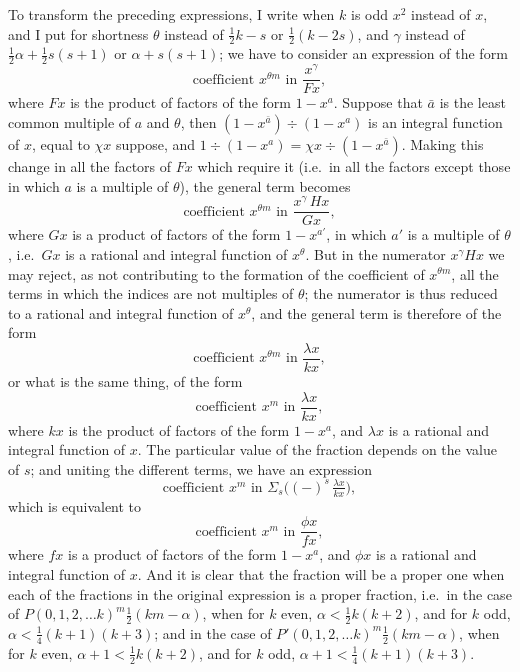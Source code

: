 \documentclass[11pt]{article}
\begin{document}
To transform the preceding expressions, I write when $k$ is odd $x^2$ instead of $x$, and I put for shortness $\theta$ instead of $\tfrac{1}{2}k - s$ or $\tfrac{1}{2}(k - 2s)$, and $\gamma$ instead of $\tfrac{1}{2}\alpha + \tfrac{1}{2}s(s+1)$ or $\alpha + s(s + 1)$; we have to consider an expression of the form
\[
\text{coefficient } x^{\theta m} \text{ in } \frac{x^\gamma}{F x},
\]
where $F x$ is the product of factors of the form $1 - x^a$. Suppose that $\bar{a}$ is the least common multiple of $a$ and $\theta$, then $(1 - x^{\bar{a}}) \div (1 - x^a)$ is an integral function of $x$, equal to $\chi x$ suppose, and $1 \div (1 - x^a) = \chi x \div (1 - x^{\bar{a}})$. Making this change in all the factors of $F x$ which require it (i.e.\ in all the factors except those in which $a$ is a multiple of $\theta$), the general term becomes
\[
\text{coefficient } x^{\theta m} \text{ in } \frac{x^\gamma\,H x}{G x},
\]
where $G x$ is a product of factors of the form $1 - x^{a'}$, in which $a'$ is a multiple of $\theta$, i.e.\ $G x$ is a rational and integral function of $x^\theta$. But in the numerator $x^\gamma H x$ we may reject, as not contributing to the formation of the coefficient of $x^{\theta m}$, all the terms in which the indices are not multiples of $\theta$; the numerator is thus reduced to a rational and integral function of $x^\theta$, and the general term is therefore of the form
\[
\text{coefficient } x^{\theta m} \text{ in } \frac{\lambda x}{k x},
\]
or what is the same thing, of the form
\[
\text{coefficient } x^m \text{ in } \frac{\lambda x}{k x},
\]
where $k x$ is the product of factors of the form $1 - x^a$, and $\lambda x$ is a rational and integral function of $x$. The particular value of the fraction depends on the value of $s$; and uniting the different terms, we have an expression
\[
\text{coefficient } x^m \text{ in } \Sigma_s\bigl((-)^s\,\tfrac{\lambda x}{k x}\bigr),
\]
which is equivalent to
\[
\text{coefficient } x^m \text{ in } \frac{\phi x}{f x},
\]
where $f x$ is a product of factors of the form $1 - x^a$, and $\phi x$ is a rational and integral function of $x$. And it is clear that the fraction will be a proper one when each of the fractions in the original expression is a proper fraction, i.e.\ in the case of $P(0, 1, 2, \ldots k)^m \tfrac{1}{2}(km - \alpha)$, when for $k$ even, $\alpha < \tfrac{1}{2}k(k+2)$, and for $k$ odd, $\alpha < \tfrac{1}{4}(k+1)(k+3)$; and in the case of $P'(0, 1, 2, \ldots k)^m \tfrac{1}{2}(km - \alpha)$, when for $k$ even, $\alpha + 1 < \tfrac{1}{2}k(k + 2)$, and for $k$ odd, $\alpha + 1 < \tfrac{1}{4}(k + 1)(k + 3)$.
\end{document}
